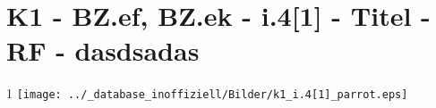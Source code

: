 \section{K1 - BZ.ef, BZ.ek - i.4[1] - Titel - RF - dasdsadas}

\begin{langesbeispiel}\item[1] %
 \texttt{[image: ../\_database\_inoffiziell/Bilder/k1\_i.4[1]\_parrot.eps]}

\end{langesbeispiel}
